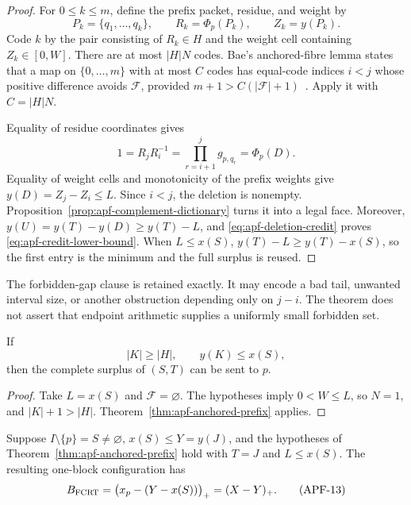 \begin{proof}
For $0\le k\le m$, define the prefix packet, residue, and weight by
\[
 P_k=\{q_1,\ldots,q_k\},
 \qquad R_k=\Phi_p(P_k),
 \qquad Z_k=y(P_k).
\]
Code $k$ by the pair consisting of $R_k\in H$ and the weight cell containing
$Z_k\in[0,W]$.  There are at most $|H|N$ codes.  Bae's anchored-fibre lemma
states that a map on $\{0,\ldots,m\}$ with at most $C$ codes has equal-code
indices $i<j$ whose positive difference avoids $\mathcal F$, provided
$m+1>C(|\mathcal F|+1)$~\cite[Lemma~5.1]{Bae2026Erdos684}.  Apply it with
$C=|H|N$.

Equality of residue coordinates gives
\[
 1=R_jR_i^{-1}
   =\prod_{r=i+1}^{j}g_{p,q_r}=\Phi_p(D).
\]
Equality of weight cells and monotonicity of the prefix weights give
$y(D)=Z_j-Z_i\le L$.  Since $i<j$, the deletion is nonempty.
Proposition~\ref{prop:apf-complement-dictionary} turns it into a legal face.
Moreover,
$y(U)=y(T)-y(D)\ge y(T)-L$, and
\eqref{eq:apf-deletion-credit} proves
\eqref{eq:apf-credit-lower-bound}.  When $L\le x(S)$,
$y(T)-L\ge y(T)-x(S)$, so the first entry is the minimum and the full
surplus is reused.
\end{proof}

The forbidden-gap clause is retained exactly.  It may encode a bad tail,
unwanted interval size, or another obstruction depending only on $j-i$.
The theorem does not assert that endpoint arithmetic supplies a uniformly
small forbidden set.

\begin{corollary}
\label{cor:apf-light-reservoir}
If
\[
                         |K|\ge|H|,\qquad y(K)\le x(S),
\tag{APF-12}\label{eq:apf-light-reservoir}
\]
then the complete surplus of $(S,T)$ can be sent to $p$.
\end{corollary}

\begin{proof}
Take $L=x(S)$ and $\mathcal F=\varnothing$.  The hypotheses imply
$0<W\le L$, so $N=1$, and $|K|+1>|H|$.
Theorem~\ref{thm:apf-anchored-prefix} applies.
\end{proof}

\begin{corollary}
\label{cor:apf-full-packet}
Suppose $I\setminus\{p\}=S\ne\varnothing$, $x(S)\le Y=y(J)$, and the
hypotheses of Theorem~\ref{thm:apf-anchored-prefix} hold with $T=J$ and
$L\le x(S)$.  The resulting one-block configuration has
\[
 B_{\rm FCRT}
  =\bigl(x_p-(Y-x(S))\bigr)_+
  =(X-Y)_+.
\tag{APF-13}\label{eq:apf-scalar-boundary}
\]
\end{corollary}

